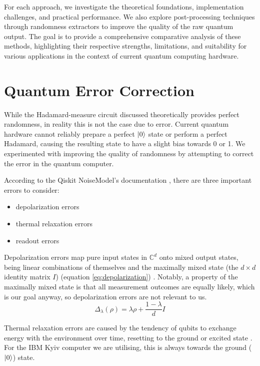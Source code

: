 \documentclass[lettersize,journal]{IEEEtran}
\begin{document}
For each approach, we investigate the theoretical foundations, implementation challenges, and practical performance. We also explore post-processing techniques through randomness extractors to improve the quality of the raw quantum output. The goal is to provide a comprehensive comparative analysis of these methods, highlighting their respective strengths, limitations, and suitability for various applications in the context of current quantum computing hardware.

\section{Quantum Error Correction}
While the Hadamard-measure circuit discussed theoretically provides perfect randomness, in reality this is not the case due to error.
Current quantum hardware cannot reliably prepare a perfect $\ket{0}$ state or perform a perfect Hadamard, causing the resulting state to have a slight bias towards 0 or 1.
We experimented with improving the quality of randomness by attempting to correct the error in the quantum computer.

According to the Qiskit NoiseModel's documentation \cite{qiskitNoiseModelDocs}, there are three important errors to consider:
\begin{itemize}
    \item depolarization errors
    \item thermal relaxation errors
    \item readout errors
\end{itemize}

Depolarization errors map pure input states in $\mathbb{C}^d$ onto mixed output states, being linear combinations of themselves and the maximally mixed state (the $d \times d$ identity matrix $I$) (equation \ref{eq:depolarization}) \cite{king2003}.
Notably, a property of the maximally mixed state is that all measurement outcomes are equally likely, which is our goal anyway, so depolarization errors are not relevant to us.
\begin{equation}
    \Delta_\lambda(\rho) = \lambda \rho + \frac{1 - \lambda}{d}I
    \label{eq:depolarization}
\end{equation}

Thermal relaxation errors are caused by the tendency of qubits to exchange energy with the environment over time, resetting to the ground or excited state \cite{georgopoulos2021}.
For the IBM Kyiv computer we are utilising, this is always towards the ground ($\ket{0}$) state.
\end{document}
